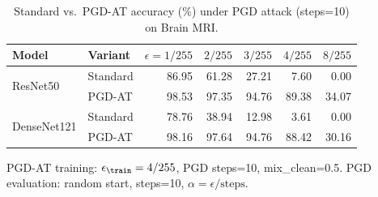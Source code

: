 \begin{table}[htbp]
  \centering
  \caption{Standard vs.\ PGD-AT accuracy (\%) under PGD attack (steps=10) on Brain MRI.}
  \label{tab:pgd_at_pgd_steps10}
  \begin{tabular}{llrrrrr}
    \toprule
    Model & Variant & $\epsilon=1/255$ & $2/255$ & $3/255$ & $4/255$ & $8/255$ \\
    \midrule
    \multirow{2}{*}{ResNet50}
      & Standard & 86.95 & 61.28 & 27.21 &  7.60 &  0.00 \\
      & PGD-AT   & 98.53 & 97.35 & 94.76 & 89.38 & 34.07 \\
    \midrule
    \multirow{2}{*}{DenseNet121}
      & Standard & 78.76 & 38.94 & 12.98 &  3.61 &  0.00 \\
      & PGD-AT   & 98.16 & 97.64 & 94.76 & 88.42 & 30.16 \\
    \bottomrule
  \end{tabular}
  \vspace{0.25em}
  \begin{minipage}{0.92\linewidth}
    \footnotesize
    PGD-AT training: $\epsilon_{\train}=4/255$, PGD steps=10, mix\_clean=0.5.
    PGD evaluation: random start, steps=10, $\alpha=\epsilon/\text{steps}$.
  \end{minipage}
\end{table}
